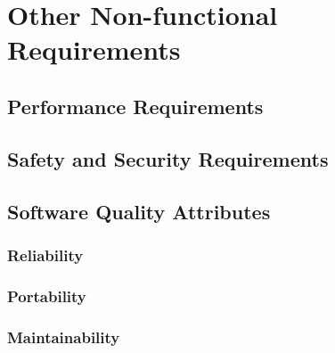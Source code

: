 
\section{Other Non-functional Requirements}\label{sec:non-functional-requirements}
    \subsection{Performance Requirements}\label{sec:performance-requirements}
    \subsection{Safety and Security Requirements}\label{sec:safety-security}
    \subsection{Software Quality Attributes}\label{sec:quality-attributes}
        \subsubsection{Reliability}\label{sec:reliability}
        \subsubsection{Portability}\label{sec:portability}
        \subsubsection{Maintainability}\label{sec:maintainability}
